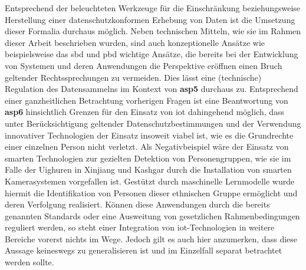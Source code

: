 Entsprechend der beleuchteten Werkzeuge für die Einschränkung beziehungsweise Herstellung einer datenschutzkonformen Erhebung von Daten ist die Umsetzung dieser Formalia durchaus möglich. Neben technischen Mitteln, wie sie im Rahmen dieser Arbeit beschrieben wurden, sind auch konzeptionelle Ansätze wie beispielsweise das \ac{sbd} und \ac{pbd} wichtige Ansätze, die bereits bei der Entwicklung von Systemen und deren Anwendungen die Perspektive eröffnen einen Bruch geltender Rechtssprechungen zu vermeiden. Dies lässt eine (technische) Regulation des Datensammelns im Kontext von \textbf{\ac{asp}5} durchaus zu. 
Entsprechend einer ganzheitlichen Betrachtung vorherigen Fragen ist eine Beantwortung von \textbf{\ac{asp}6} hinsichtlich Grenzen für den Einsatz von \ac{iot} dahingehend möglich, dass unter Berücksichtigung geltender Datenschutzbestimmungen und der Verwendung innovativer Technologien der Einsatz insoweit viabel ist, wie es die Grundrechte einer einzelnen Person nicht verletzt. Als Negativbeispiel wäre der Einsatz von smarten Technologien zur gezielten Detektion von Personengruppen, wie sie im Falle der Uighuren in Xinjiang und Kashgar \cite{Drexel2020} durch die Installation von smarten Kamerasystemen vorgefallen ist. Gestützt durch maschinelle Lernmodelle wurde hiermit die Identifikation von Personen dieser ethnischen Gruppe ermöglicht und deren Verfolgung realisiert. 
Können diese Anwendungen durch die bereits genannten Standards oder eine Ausweitung von gesetzlichen Rahmenbedingungen reguliert werden, so steht einer Integration von \ac{iot}-Technologien in weitere Bereiche vorerst nichts im Wege. Jedoch gilt es auch hier anzumerken, dass diese Aussage keineswegs zu generalisieren ist und im Einzelfall separat betrachtet werden sollte. 
